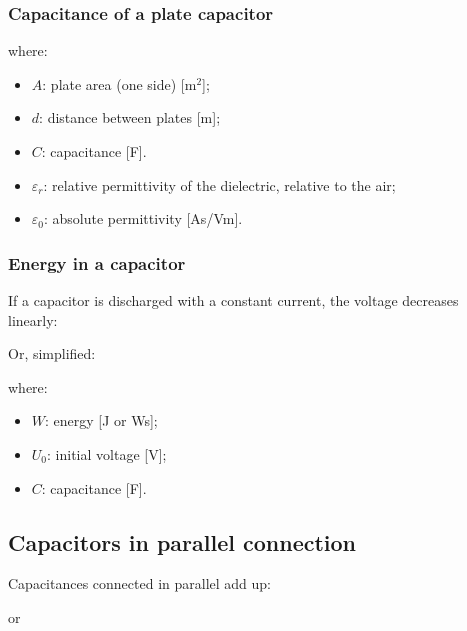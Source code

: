 \documentclass{article}
\begin{document}
\subsubsection{Capacitance of a plate capacitor}

where:
\begin{itemize}
    \item $A$: plate area (one side) [m$^2$];
    \item $d$: distance between plates [m];
    \item $C$: capacitance [F].
\end{itemize}

\begin{itemize}
    \item $\varepsilon_r$: relative permittivity of the dielectric, relative to the air;
    \item $\varepsilon_0$: absolute permittivity [As/Vm].
\end{itemize}

\subsubsection{Energy in a capacitor}
If a capacitor is discharged with a constant current, the voltage decreases linearly:


Or, simplified:

where:
\begin{itemize}
    \item $W$: energy [J or Ws];
    \item $U_0$: initial voltage [V];
    \item $C$: capacitance [F].
\end{itemize}

\subsection{Capacitors in parallel connection}
Capacitances connected in parallel add up:

or

\end{document}
